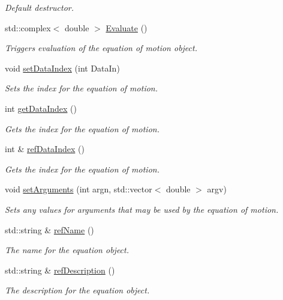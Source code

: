 \begin{DoxyCompactItemize}
\begin{DoxyCompactList}\small\item\em Default destructor. \end{DoxyCompactList}\item 
std\-::complex$<$ double $>$ \hyperlink{classosea_1_1ofreq_1_1_equationof_motion_a7198b4661f6c0a4c1f280863228bd63c}{Evaluate} ()
\begin{DoxyCompactList}\small\item\em Triggers evaluation of the equation of motion object. \end{DoxyCompactList}\item 
void \hyperlink{classosea_1_1ofreq_1_1_equationof_motion_a5a8674f3d8715973fa0affc162ae677c}{set\-Data\-Index} (int Data\-In)
\begin{DoxyCompactList}\small\item\em Sets the index for the equation of motion. \end{DoxyCompactList}\item 
int \hyperlink{classosea_1_1ofreq_1_1_equationof_motion_a45052d6a9814ffa899d1824f5d8e8cee}{get\-Data\-Index} ()
\begin{DoxyCompactList}\small\item\em Gets the index for the equation of motion. \end{DoxyCompactList}\item 
int \& \hyperlink{classosea_1_1ofreq_1_1_equationof_motion_ae16051cbf725210aa44941d41d8800e2}{ref\-Data\-Index} ()
\begin{DoxyCompactList}\small\item\em Gets the index for the equation of motion. \end{DoxyCompactList}\item 
void \hyperlink{classosea_1_1ofreq_1_1_equationof_motion_a154640d80a23348fa9183b6c4ebe3f37}{set\-Arguments} (int argn, std\-::vector$<$ double $>$ argv)
\begin{DoxyCompactList}\small\item\em Sets any values for arguments that may be used by the equation of motion. \end{DoxyCompactList}\item 
std\-::string \& \hyperlink{classosea_1_1ofreq_1_1_equationof_motion_abb7b1a4295e8406ea4f155b1f03689f6}{ref\-Name} ()
\begin{DoxyCompactList}\small\item\em The name for the equation object. \end{DoxyCompactList}\item 
std\-::string \& \hyperlink{classosea_1_1ofreq_1_1_equationof_motion_a5be5a333dd1a5a65eaadec4b32c68fb5}{ref\-Description} ()
\begin{DoxyCompactList}\small\item\em The description for the equation object. \end{DoxyCompactList}\end{DoxyCompactItemize}
